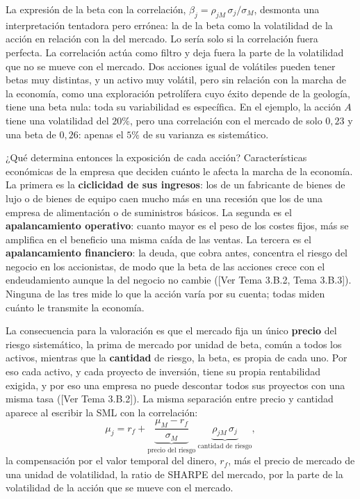 \documentclass[10pt,a4paper]{article}
\newcommand{\authorfont}[1]{{\fontfamily{EBGaramond-TLF}\selectfont #1}}
\begin{document}
La expresión de la beta con la correlación, $\beta_j=\rho_{jM}\,\sigma_j/\sigma_M$, desmonta una interpretación tentadora pero errónea: la de la beta como la volatilidad de la acción en relación con la del mercado. Lo sería solo si la correlación fuera perfecta. La correlación actúa como filtro y deja fuera la parte de la volatilidad que no se mueve con el mercado. Dos acciones igual de volátiles pueden tener betas muy distintas, y un activo muy volátil, pero sin relación con la marcha de la economía, como una exploración petrolífera cuyo éxito depende de la geología, tiene una beta nula: toda su variabilidad es específica. En el ejemplo, la acción $A$ tiene una volatilidad del $20\%$, pero una correlación con el mercado de solo $0{,}23$ y una beta de $0{,}26$: apenas el $5\%$ de su varianza es sistemático.

¿Qué determina entonces la exposición de cada acción? Características económicas de la empresa que deciden cuánto le afecta la marcha de la economía. La primera es la \textbf{ciclicidad de sus ingresos}: los de un fabricante de bienes de lujo o de bienes de equipo caen mucho más en una recesión que los de una empresa de alimentación o de suministros básicos. La segunda es el \textbf{apalancamiento operativo}: cuanto mayor es el peso de los costes fijos, más se amplifica en el beneficio una misma caída de las ventas. La tercera es el \textbf{apalancamiento financiero}: la deuda, que cobra antes, concentra el riesgo del negocio en los accionistas, de modo que la beta de las acciones crece con el endeudamiento aunque la del negocio no cambie ([\authorfont{Ver Tema 3.B.2, Tema 3.B.3}]). Ninguna de las tres mide lo que la acción varía por su cuenta; todas miden cuánto le transmite la economía.

La consecuencia para la valoración es que el mercado fija un único \textbf{precio} del riesgo sistemático, la prima de mercado por unidad de beta, común a todos los activos, mientras que la \textbf{cantidad} de riesgo, la beta, es propia de cada uno. Por eso cada activo, y cada proyecto de inversión, tiene su propia rentabilidad exigida, y por eso una empresa no puede descontar todos sus proyectos con una misma tasa ([\authorfont{Ver Tema 3.B.2}]). La misma separación entre precio y cantidad aparece al escribir la SML con la correlación:
$$\mu_j=r_f+\underbrace{\frac{\mu_M-r_f}{\sigma_M}}_{\text{precio del riesgo}}\ \underbrace{\rho_{jM}\,\sigma_j}_{\text{cantidad de riesgo}},$$
la compensación por el valor temporal del dinero, $r_f$, más el precio de mercado de una unidad de volatilidad, la ratio de SHARPE del mercado, por la parte de la volatilidad de la acción que se mueve con el mercado.
\end{document}
